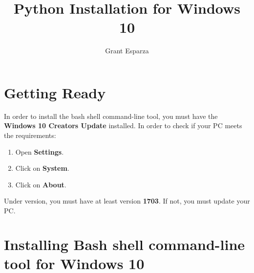 \documentclass[12pt, titlepage]{article}
\title{Python Installation for Windows 10}
\author{Grant Esparza}
\begin{document}
	
	\section*{Getting Ready}
	
		In order to install the bash shell command-line tool, you must have the \textbf{Windows 10 Creators Update} installed.  In order to check if your PC meets the requirements:
			
			\begin{enumerate}
				
				\item Open \textbf{Settings}.
				
				\item Click on \textbf{System}.
				
				\item Click on \textbf{About}.
				
			\end{enumerate} 
		Under version, you must have at least version \textbf{1703}.  If not, you must update your PC.
		
	\section*{Installing Bash shell command-line tool for Windows 10}
	
\end{document}

